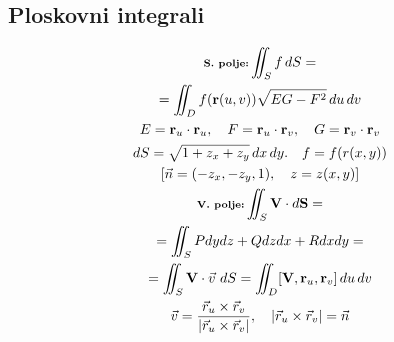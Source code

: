\documentclass[a4paper,fleqn]{article} %
\begin{document}
\subsection*{Ploskovni integrali}
\begin{gather*}
    \textbf{\scriptsize S. polje:}
        \iint_S f \, dS =\\= \iint_D f(\mathbf{r}(u,v)) \sqrt{EG-F^2} \, du \, dv \\
        E = \mathbf{r}_u \cdot \mathbf{r}_u,\quad F = \mathbf{r}_u \cdot \mathbf{r}_v,\quad G =  \mathbf{r}_v \cdot \mathbf{r}_v \\
        dS = \sqrt{1+z_x+z_y} \, dx \, dy. \quad f = f(r(x,y))\\
        [\vec{n} = (-z _x, -z _y, 1), \quad z = z(x,y) ]\\
    \textbf{\scriptsize V. polje:}
        \iint_S \mathbf{V} \cdot d\mathbf{S} =\\= \iint_S Pdydz+Qdzdx+Rdxdy =\\= \iint _S \mathbf V \cdot \vec{v} \text{ } dS = \iint_D [\mathbf{V}, \mathbf{r}_u, \mathbf{r}_v] \, du \, dv \\
            \vec{v} = \frac{\vec r _u \times \vec r _v}{|\vec r _u \times \vec r _v|}, \quad
            |\vec r _u \times \vec r _v| = \vec n
\end{gather*}
\end{document}
